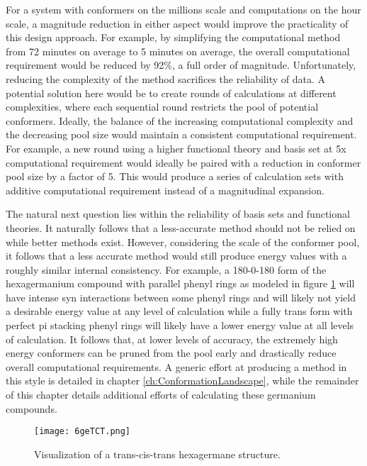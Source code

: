 For a system with conformers on the millions scale and computations on the hour scale, a magnitude reduction in either aspect would improve the practicality of this design approach.
For example, by simplifying the computational method from 72 minutes on average to 5 minutes on average, the overall computational requirement would be reduced by 92\%, a full order of magnitude. 
Unfortunately, reducing the complexity of the method sacrifices the reliability of data.
A potential solution here would be to create rounds of calculations at different complexities, where each sequential round restricts the pool of potential conformers.
Ideally, the balance of the increasing computational complexity and the decreasing pool size would maintain a consistent computational requirement.
For example, a new round using a higher functional theory and basis set at 5x computational requirement would ideally be paired with a reduction in conformer pool size by a factor of 5.
This would produce a series of calculation sets with additive computational requirement instead of a magnitudinal expansion.

The natural next question lies within the reliability of basis sets and functional theories. 
It naturally follows that a less-accurate method should not be relied on while better methods exist. 
However, considering the scale of the conformer pool, it follows that a less accurate method would still produce energy values with a roughly similar internal consistency. 
For example, a 180-0-180 form of the hexagermanium compound with parallel phenyl rings as modeled in figure \ref{fig:6geTCT} will have intense syn interactions between some phenyl rings and will likely not yield a desirable energy value at any level of calculation while a fully trans form with perfect pi stacking phenyl rings will likely have a lower energy value at all levels of calculation.
It follows that, at lower levels of accuracy, the extremely high energy conformers can be pruned from the pool early and drastically reduce overall computational requirements.
A generic effort at producing a method in this style is detailed in chapter \ref{ch:ConformationLandscape}, while the remainder of this chapter details additional efforts of calculating these germanium compounds.

\begin{figure}
	
	\centering
	
	\texttt{[image: 6geTCT.png]}
	
	\caption{Visualization of a trans-cis-trans hexagermane structure.}
	
	\label{fig:6geTCT}
	
\end{figure}

